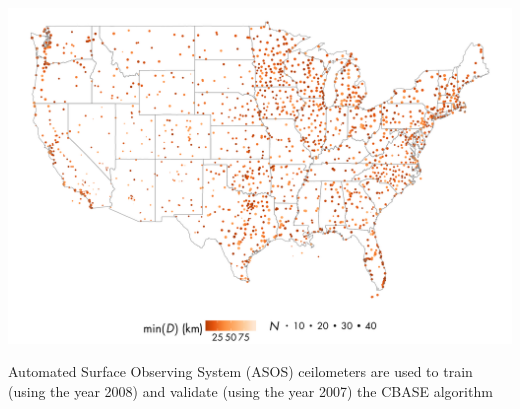 \documentclass[final,t,12pt]{beamer}\usepackage[]{graphicx}\usepackage[]{color}
\newenvironment{knitrout}{}{} %
\begin{document}
\begin{frame}[fragile]{}
\begin{tcolorbox}
\begin{tcbitemize}[raster equal height=rows, raster columns = 11
      ]
\begin{tcbitemize}[raster columns=1]
\begin{knitrout}
{\centering \includegraphics[width=\textwidth]{figure/cfmip-cbase-170926-eval-asos-1} 

}



\end{knitrout}
        Automated Surface Observing System (ASOS) ceilometers are used to train
        (using the year 2008) and validate (using the year 2007) the CBASE
        algorithm

        \tcbitem[title={Validation: How well do we estimate CBH and CBH uncertainty?}] 
        \begin{columns}
          \begin{column}{0.5\linewidth}
\begin{knitrout}
\color{fgcolor}


\end{knitrout}
\end{column}
\end{columns}
\end{tcbitemize}
\end{tcbitemize}
\end{tcolorbox}
\end{frame}
\end{document}
